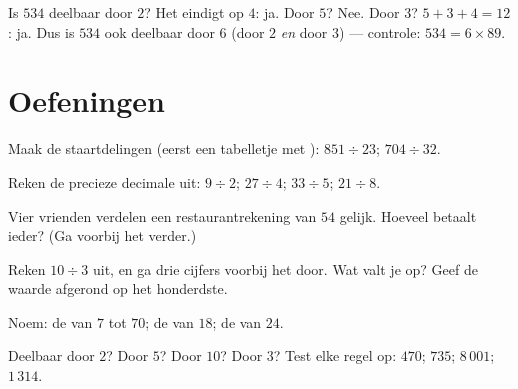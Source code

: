 \begin{example}\label{ex:g5:division:criteria}
Is $534$ deelbaar door $2$? Het eindigt op $4$: ja. Door $5$? Nee. Door $3$?
$5 + 3 + 4 = 12$: ja. Dus is $534$ ook deelbaar door $6$ (door $2$ \emph{en}
door $3$) --- controle: $534 = 6 \times 89$.
\end{example}

\section{Oefeningen}

\begin{exercise}[$\star$]\label{exo:g5:division:1}
Maak de staartdelingen (eerst een tabelletje met ):
$851 \div 23$; \quad $704 \div 32$.
\end{exercise}

\begin{exercise}[$\star$]\label{exo:g5:division:2}
Reken de precieze decimale  uit: $9 \div 2$; \quad $27 \div 4$;
\quad $33 \div 5$; \quad $21 \div 8$.
\end{exercise}

\begin{exercise}[$\star$]\label{exo:g5:division:3}
Vier vrienden verdelen een restaurantrekening van $54$ gelijk. Hoeveel
betaalt ieder? (Ga voorbij het  verder.)
\end{exercise}

\begin{exercise}[$\star$]\label{exo:g5:division:4}
Reken $10 \div 3$ uit, en ga drie cijfers voorbij het  door.
Wat valt je op? Geef de waarde afgerond op het honderdste.
\end{exercise}

\begin{exercise}[$\star$]\label{exo:g5:division:5}
Noem: de  van $7$ tot $70$; de  van $18$; de  van
$24$.
\end{exercise}

\begin{exercise}[$\star$]\label{exo:g5:division:6}
Deelbaar door $2$? Door $5$? Door $10$? Door $3$? Test elke regel op:
$470$; \quad $735$; \quad $8\,001$; \quad $1\,314$.
\end{exercise}

